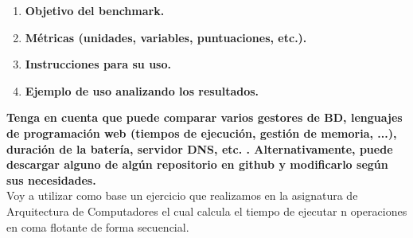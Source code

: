 \begin{enumerate}
	\item \textbf{Objetivo del benchmark.}
	\item \textbf{Métricas (unidades, variables, puntuaciones, etc.).}
	\item \textbf{Instrucciones para su uso.}
	\item \textbf{Ejemplo de uso analizando los resultados.}
\end{enumerate}

\textbf{Tenga en cuenta que puede comparar varios gestores de BD, lenguajes de programación web (tiempos de ejecución, gestión de memoria, ...), duración de la batería, servidor DNS, etc. . Alternativamente, puede descargar alguno de algún repositorio en github y modificarlo según sus necesidades.}\\

Voy a utilizar como base un ejercicio que realizamos en la asignatura de Arquitectura de Computadores el cual calcula el tiempo de ejecutar n operaciones en coma flotante de forma secuencial.

















